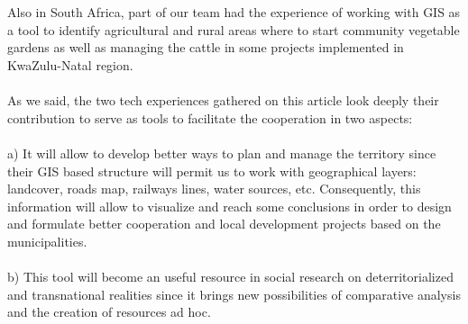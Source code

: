 \\
\\
Also in South Africa, part of our team had the experience of working with GIS as a tool to identify agricultural and rural areas where to start community vegetable gardens as well as managing the cattle in some projects implemented in KwaZulu-Natal region.
\\
\\
As we said, the two tech experiences gathered on this article look deeply their contribution to serve as tools to facilitate the cooperation in two aspects:
\\
\\
a) It will allow to develop better ways to plan and manage the territory since their GIS based structure will permit us to work with geographical layers: landcover, roads map, railways lines, water sources, etc. Consequently, this information will allow to visualize and reach some conclusions in order to design and formulate better cooperation and local development projects based on the municipalities.
\\
\\
b) This tool will become an useful resource in social research\citep{fielding2008sage} on  deterritorialized and transnational realities\citep{sassen2007sociología} since it brings new possibilities of comparative analysis and the creation of resources ad hoc. 

